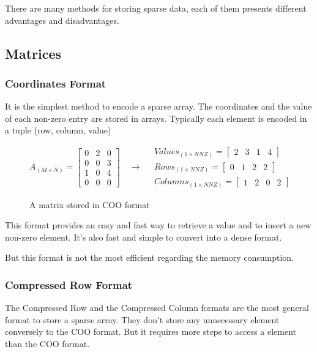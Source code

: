 There are many methods for storing sparse data, each of them presents different advantages and disadvantages.

\subsection{Matrices}
\subsubsection{Coordinates Format}

It is the simplest method to encode a sparse array. The coordinates and the value of each non-zero entry are stored in arrays.
Typically each element is encoded in a tuple (row, column, value)


\begin{figure}[h]
	\[
	A_{(M\times N)} = 
	\begin{bmatrix}
	0 &  2 & 0 \\
	0 &  0 & 3 \\
	1 &  0 & 4\\
	0 &  0 & 0
	\end{bmatrix}
	\quad\rightarrow\quad
	\begin{aligned}
	Values_{(1\times NNZ)} = 
	\begin{bmatrix}
	2 &  3 & 1 & 4
	\end{bmatrix}
	\\
	Rows_{(1\times NNZ)} = 
	\begin{bmatrix}
	0 &  1 & 2 & 2
	\end{bmatrix}
	\\
	Columns_{(1\times NNZ)} = 
	\begin{bmatrix}
	1 &  2 & 0 & 2
	\end{bmatrix}
	\end{aligned}
	\]
	\caption{A matrix stored in COO format}
	\label{fig:cooformat}
\end{figure}

This format provides an easy and fast way to retrieve a value and to insert a new non-zero element. It's also fast and simple to convert into a dense format.

But this format is not the most efficient regarding the memory consumption.

\subsubsection{Compressed Row Format}

The Compressed Row and the Compressed Column formats are the most general format to store a sparse array. They don't store any unnecessary element conversely to the COO format. But it requires more steps to access a element than the COO format. 

